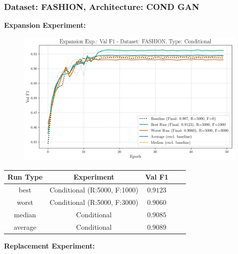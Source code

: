 \subsubsection{Dataset: FASHION, Architecture: COND GAN}
\noindent\textbf{Expansion Experiment:}
\begin{figure}[htbp]
	\centering
	\includegraphics[width=.85\textwidth]{abb/strat_classifier_performance/FASHION_STRATIFIED_CLASSIFIERS_COND_GAN/expansion_experiments/val_f1_score_['COND']_FASHION_all.png}
	\label{fig:app_strat_class_performance_expansion_exp._val_f1_score_}
\end{figure}
\begin{table}[H]
	\centering
	\vspace{-1em}
	\begin{tabular}{|c|c|c|c|c|}
		\hline
		Run Type & Experiment & Val F1 \\ \hline
		best & Conditional (R:5000, F:1000) & $0.9123$\\ \hline
		worst & Conditional (R:5000, F:3000) & $0.9060$\\ \hline
		median & Conditional & $0.9085$\\ \hline
		average & Conditional & $0.9089$
		\\ \hline
	\end{tabular}
\end{table}
\noindent\textbf{Replacement Experiment:}
